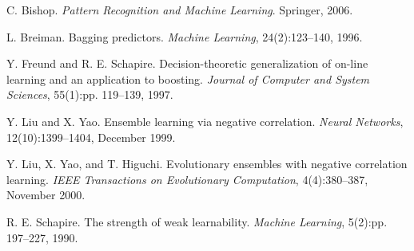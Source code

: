 \documentclass[12pt]{extarticle}
\begin{document}
\begin{thebibliography}{9}
C. Bishop. \textit{Pattern Recognition and Machine Learning}. Springer, 2006.

L. Breiman. Bagging predictors. \textit{Machine Learning}, 24(2):123–140, 1996.

Y. Freund and R. E. Schapire. Decision-theoretic generalization of on-line learning and an application to boosting. \textit{Journal of Computer and System Sciences}, 55(1):pp. 119–139, 1997.

Y. Liu and X. Yao. Ensemble learning via negative correlation. \textit{Neural Networks}, 12(10):1399–1404, December 1999.

Y. Liu, X. Yao, and T. Higuchi. Evolutionary ensembles with negative correlation learning. \textit{IEEE Transactions on Evolutionary Computation}, 4(4):380–387, November 2000.

R. E. Schapire. The strength of weak learnability. \textit{Machine Learning}, 5(2):pp. 197–227, 1990.
\end{thebibliography}
\end{document}

